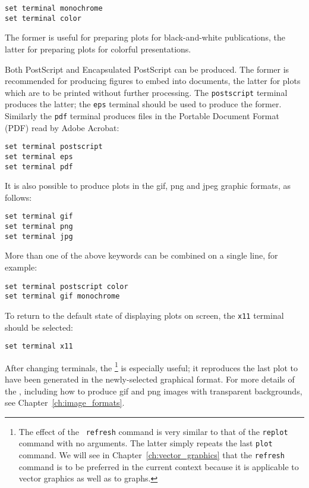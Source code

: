 \begin{verbatim}
set terminal monochrome
set terminal color
\end{verbatim}

\noindent The former is useful for preparing plots for black-and-white
publications, the latter for preparing plots for colorful presentations.

Both PostScript and Encapsulated PostScript can be produced. The former is
recommended for producing figures to embed into documents, the latter for plots
which are to be printed without further processing. The {\tt postscript}
terminal produces the latter; the {\tt eps} terminal should be used to produce
the former.  Similarly the {\tt pdf} terminal produces files in the Portable
Document Format (PDF) read by Adobe Acrobat:

\begin{verbatim}
set terminal postscript
set terminal eps
set terminal pdf
\end{verbatim}

It is also possible to produce plots in the gif, png and jpeg graphic formats,
as follows:

\begin{verbatim}
set terminal gif
set terminal png
set terminal jpg
\end{verbatim}

More than one of the above keywords can be combined on a single line, for
example:

\begin{verbatim}
set terminal postscript color
set terminal gif monochrome
\end{verbatim}

To return to the default state of displaying plots on screen, the {\tt x11}
terminal should be selected:

\begin{verbatim}
set terminal x11
\end{verbatim}

After changing terminals, the \footnote{The effect of the {\tt
refresh} command is very similar to that of the {\tt replot} command with no
arguments. The latter simply repeats the last {\tt plot} command. We will see
in Chapter~\ref{ch:vector_graphics} that the {\tt refresh} command is to be
preferred in the current context because it is applicable to vector graphics as
well as to graphs.} is especially useful; it reproduces the last plot to have
been generated in the newly-selected graphical format.  For more details of the
, including how to produce gif and png images with
transparent backgrounds, see Chapter~\ref{ch:image_formats}.

